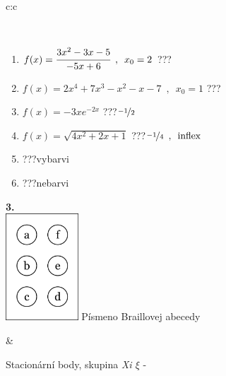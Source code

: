 \documentclass[10pt]{report}
\begin{document}
\begin{tabular}{c:c}
\begin{minipage}[c][104.5mm][t]{0.5\linewidth}
\begin{center}
\begin{minipage}{0.95\linewidth}
\begin{center}
\end{center}
\end{minipage}
\\[1mm]
\begin{minipage}{0.79\linewidth}
\begin{center}
\begin{varwidth}{\linewidth}
\begin{enumerate}
\normalsize
\item $f(x)=\cfrac{3x^2-3x-5}{-5x+6}\enspace , \enspace x_0=2$\quad \dotfill\; ???\;\dotfill \quad {}
\item $f(x)=2x^4+7x^3-x^2-x-7\enspace , \enspace x_0=1$\quad \dotfill\; ???\;\dotfill \quad {}
\item $f(x)=-3xe^{-2x}$\quad \dotfill\; ???\;\dotfill \quad $\nicefrac{-1}{2}$
\item $f(x)=\sqrt{4x^2+2x+1}$\quad \dotfill\; ???\;\dotfill \quad $\nicefrac{-1}{4}\enspace , \enspace\mathrm{inflex}$
\item \quad \dotfill\; ???\;\dotfill \quad vybarvi
\item \quad \dotfill\; ???\;\dotfill \quad nebarvi
\end{enumerate}
\end{varwidth}
\end{center}
\end{minipage}
\begin{minipage}{0.20\linewidth}
\begin{center}
{\Huge\bfseries 3.} \\[2mm]
\includegraphics[height=40mm]{../images/braille.png}
{\small Písmeno Braillovej abecedy}
\end{center}
\end{minipage}
\end{center}
\end{minipage}
&
\begin{minipage}[c][104.5mm][t]{0.5\linewidth}
\begin{center}
\vspace{7mm}
{\huge Stacionární body, skupina \textit{Xi $\xi$} -}\\[5mm]

\end{center}
\end{minipage}
\end{tabular}
\end{document}
